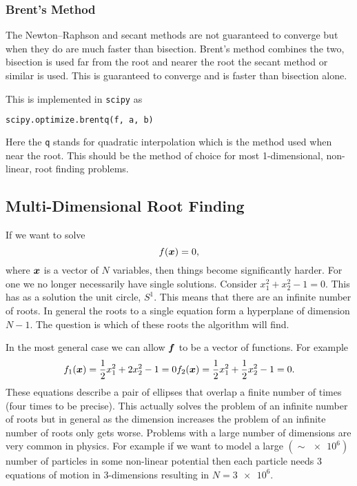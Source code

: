 \documentclass[a4paper]{article}
\begin{document}
    \subsubsection{Brent's Method}
    The Newton--Raphson and secant methods are not guaranteed to converge but when they do are much faster than bisection.
    Brent's method combines the two, bisection is used far from the root and nearer the root the secant method or similar is used.
    This is guaranteed to converge and is faster than bisection alone.
    
    This is implemented in \lstinline[language=python]|scipy| as
    \begin{lstlisting}[language=python]
    scipy.optimize.brentq(f, a, b)
    \end{lstlisting}
    Here the \lstinline[language=python]|q| stands for quadratic interpolation which is the method used when near the root.
    This should be the method of choice for most 1-dimensional, non-linear, root finding problems.
    
    \subsection{Multi-Dimensional Root Finding}
    If we want to solve
    \[f(\bm{x}) = 0,\]
    where \(\bm{x}\) is a vector of \(N\) variables, then things become significantly harder.
    For one we no longer necessarily have single solutions.
    Consider \(x_1^2 + x_2^2 - 1 = 0\).
    This has as a solution the unit circle, \(S^1\).
    This means that there are an infinite number of roots.
    In general the roots to a single equation form a hyperplane of dimension \(N-1\).
    The question is which of these roots the algorithm will find.
    
    In the most general case we can allow \(\bm{f}\) to be a vector of functions.
    For example
    \begin{equation}
        f_1(\bm{x}) = \frac{1}{2}x_1^2 + 2x_2^2 - 1 = 0\\
        f_2(\bm{x}) = \frac{1}{2}x_1^2 + \frac{1}{2}x_2^2 - 1 = 0.
    \end{equation}
    These equations describe a pair of ellipses that overlap a finite number of times (four times to be precise).
    This actually solves the problem of an infinite number of roots but in general as the dimension increases the problem of an infinite number of roots only gets worse.
    Problems with a large number of dimensions are very common in physics.
    For example if we want to model a large \((\sim\num{e6})\) number of particles in some non-linear potential then each particle needs 3 equations of motion in 3-dimensions resulting in \(N = \num{3e6}\).
    
\end{document}
